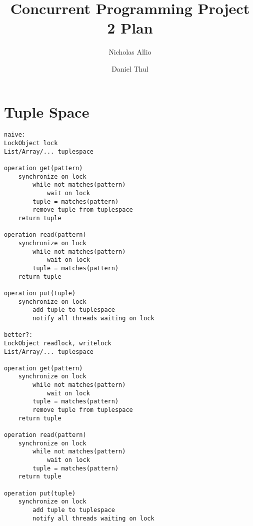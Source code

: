 \documentclass[10pt,a4paper]{article}
\author{Nicholas Allio \and Daniel Thul}
\title{Concurrent Programming Project 2 Plan}
\begin{document}
\maketitle

\section{Tuple Space}
\begin{verbatim}
naive:
LockObject lock
List/Array/... tuplespace

operation get(pattern)
	synchronize on lock
		while not matches(pattern)
			wait on lock
		tuple = matches(pattern)
		remove tuple from tuplespace
	return tuple

operation read(pattern)
	synchronize on lock
		while not matches(pattern)
			wait on lock
		tuple = matches(pattern)
	return tuple

operation put(tuple)
	synchronize on lock
		add tuple to tuplespace
		notify all threads waiting on lock

better?:
LockObject readlock, writelock
List/Array/... tuplespace

operation get(pattern)
	synchronize on lock
		while not matches(pattern)
			wait on lock
		tuple = matches(pattern)
		remove tuple from tuplespace
	return tuple

operation read(pattern)
	synchronize on lock
		while not matches(pattern)
			wait on lock
		tuple = matches(pattern)
	return tuple

operation put(tuple)
	synchronize on lock
		add tuple to tuplespace
		notify all threads waiting on lock
\end{verbatim}
\end{document}
